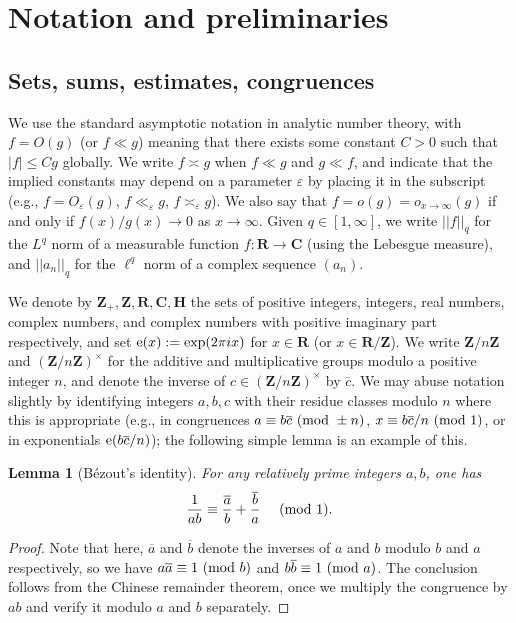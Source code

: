 \documentclass[reqno,11pt]{amsart}
\newtheorem{lemma}[theorem]{Lemma}
\theoremstyle{definition}
\theoremstyle{remark}
\numberwithin{equation}{section}
\newcommand{\Z}{\mathbf{Z}}
\newcommand{\R}{\mathbf{R}}
\newcommand{\C}{\mathbf{C}}
\renewcommand{\H}{\mathbf{H}}
\newcommand{\e}{\textnormal{e}}
\newcommand{\eps}{\varepsilon}
\renewcommand{\bar}{\overline}
\renewcommand{\pmod}[1]{\ (\textnormal{mod } #1)}
\begin{document}
\begin{figure}[omitted: a diagram of this paper's results, not reproduced here]\label{fig:outline}\end{figure}
\FloatBarrier






\section{Notation and preliminaries}

\subsection{Sets, sums, estimates, congruences}
We use the standard asymptotic notation in analytic number theory, with $f = O(g)$ (or $f \ll g$) meaning that there exists some constant $C > 0$ such that $|f| \le Cg$ globally. We write $f \asymp g$ when $f \ll g$ and $g \ll f$, and indicate that the implied constants may depend on a parameter $\eps$ by placing it in the subscript (e.g., $f = O_\eps(g)$, $f \ll_\eps g$, $f \asymp_\eps g$). We also say that $f = o(g) = o_{x \to \infty}(g)$ if and only if $f(x)/g(x) \to 0$ as $x \to \infty$. Given $q \in [1, \infty]$, we write $||f||_q$ for the $L^q$ norm of a measurable function $f : \R \to \C$ (using the Lebesgue measure), and $||a_n||_q$ for the $\ell^q$ norm of a complex sequence $(a_n)$.

We denote by $\Z_+, \Z, \R, \C, \H$ the sets of positive integers, integers, real numbers, complex numbers, and complex numbers with positive imaginary part respectively, and set $\e(x) := \exp(2 \pi i x)$ for $x \in \R$ (or $x \in \R/\Z$). We write $\Z/n\Z$ and $(\Z/n\Z)^\times$ for the additive and multiplicative groups modulo a positive integer $n$, and denote the inverse of $c \in (\Z/n\Z)^\times$ by $\bar{c}$. We may abuse notation slightly by identifying integers 
$a, b, c$ with their residue classes modulo $n$ where this is appropriate (e.g., in congruences $a \equiv b \bar{c} \pmod{\pm n}$, $x \equiv b\bar{c}/n \pmod{1}$, or in exponentials $\e (b \bar{c}/n)$); the following simple lemma is an example of this.

\begin{lemma}[B\'ezout's identity] \label{lem:bezout}
For any relatively prime integers $a, b$, one has
\[
    \frac{1}{ab} \equiv \frac{\bar{a}}{b} + \frac{\bar{b}}{a} \quad \pmod{1}.
\]
\end{lemma}
\begin{proof}
Note that here, $\bar{a}$ and $\bar{b}$ denote the inverses of $a$ and $b$ modulo $b$ and $a$ respectively, so we have $a \bar{a} \equiv 1 \pmod{b}$ and $b \bar{b} \equiv 1 \pmod{a}$. The conclusion follows from the Chinese remainder theorem, once we multiply the congruence by $ab$ and verify it modulo $a$ and $b$ separately.
\end{proof}
\end{document}
